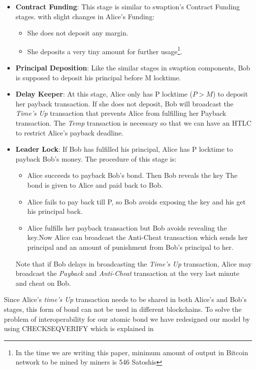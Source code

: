 \begin{itemize}
    \item \textbf{Contract Funding}: This stage is similar to swaption's Contract Funding stages. with slight changes in Alice's Funding:
    \begin{itemize}
        \item She does not deposit any margin.
        \item She deposits a very tiny amount for further usage\footnote{In the time we are writing this paper, minimum amount of output in Bitcoin network to be mined by miners is 546 Satoshis}.
    \end{itemize}
    
    \item \textbf{Principal Deposition}: Like the similar stages in swaption components, Bob is supposed to deposit his principal before M locktime.
    
    \item \textbf{Delay Keeper}: At this stage, Alice only has P locktime ($P > M$) to deposit her payback transaction. If she does not deposit, Bob will broadcast the {\it Time's Up} transaction that prevents Alice from fulfilling her Payback transaction. The {\it Temp} transaction is necessary so that we can have an HTLC to restrict Alice's payback deadline. 
    
    \item \textbf{Leader Lock}: If Bob has fulfilled his principal, Alice has P locktime to payback Bob's money. The procedure of this stage is: 
    \begin{itemize}
        \item Alice succeeds to payback Bob's bond. Then Bob reveals the \keyone key The bond is given to Alice and paid back to Bob.
        \item Alice fails to pay back till P, so Bob avoids exposing the \keyone key and his get his principal back.
        \item Alice fulfills her payback transaction but Bob avoids revealing the \keyone key.Now Alice can broadcast the Anti-Cheat transaction which sends her principal and an amount of punishment from Bob's principal to her. 
    \end{itemize}

    Note that if Bob delays in broadcasting the {\it Time's Up} transaction, Alice may broadcast the {\it Payback} and {\it Anti-Cheat} transaction at the very last minute and cheat on Bob.

\end{itemize}

Since Alice's {\it time's Up} transaction needs to be shared in both Alice's and Bob's stages, this form of bond can not be used in different blockchains. To solve the problem of interoperability for our atomic bond we have redesigned our model by using CHECKSEQVERIFY which is explained in \Apn{\ref{app:non-collat-bond}} 